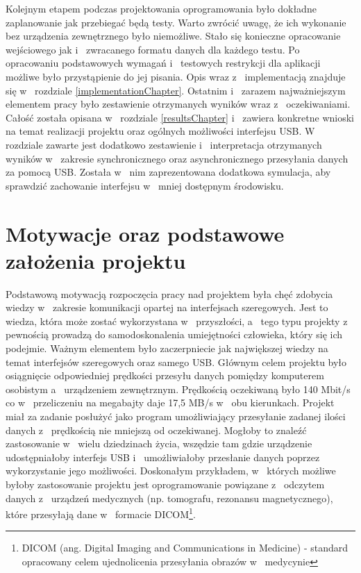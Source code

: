 \documentclass{BscUS}
\begin{document}
\newline
\indent Kolejnym etapem podczas projektowania oprogramowania było dokładne zaplanowanie jak przebiegać będą testy. Warto zwrócić uwagę, że ich wykonanie bez urządzenia zewnętrznego było niemożliwe. Stało się konieczne opracowanie wejściowego jak i~ zwracanego formatu danych dla każdego testu. Po opracowaniu podstawowych wymagań i~ testowych restrykcji dla aplikacji możliwe było przystąpienie do jej pisania. Opis wraz z~ implementacją znajduje się w~ rozdziale \ref{implementationChapter}.
\newline
\indent Ostatnim i~ zarazem najważniejszym elementem pracy było zestawienie otrzymanych wyników wraz z~ oczekiwaniami. Całość została opisana w~ rozdziale \ref{resultsChapter} i~ zawiera konkretne wnioski na temat realizacji projektu oraz ogólnych możliwości interfejsu USB. W~ rozdziale zawarte jest dodatkowo zestawienie i~ interpretacja otrzymanych wyników w~ zakresie synchronicznego oraz asynchronicznego przesyłania danych za pomocą USB. Została w~ nim zaprezentowana dodatkowa symulacja, aby sprawdzić zachowanie interfejsu w~ mniej dostępnym środowisku.

\chapter{Motywacje oraz podstawowe założenia projektu}
\label{ch:motivationAndBasics}
\indent Podstawową motywacją rozpoczęcia pracy nad projektem była chęć zdobycia wiedzy w~ zakresie komunikacji opartej na interfejsach szeregowych. Jest to wiedza, która może zostać wykorzystana w~ przyszłości, a~ tego typu projekty z~ pewnością prowadzą do samodoskonalenia umiejętności człowieka, który się ich podejmie. Ważnym elementem było zaczerpniecie jak największej wiedzy na temat interfejsów szeregowych oraz samego USB.
\newline
\indent Głównym celem projektu było osiągnięcie odpowiedniej prędkości przesyłu danych pomiędzy komputerem osobistym a~ urządzeniem zewnętrznym. Prędkością oczekiwaną było 140 Mbit/s co w~ przeliczeniu na megabajty daje 17,5 MB/s w~ obu kierunkach. Projekt miał za zadanie posłużyć jako program umożliwiający przesyłanie zadanej ilości danych z~ prędkością nie mniejszą od oczekiwanej. Mogłoby to znaleźć zastosowanie w~ wielu dziedzinach życia, wszędzie tam gdzie urządzenie udostępniałoby interfejs USB i~ umożliwiałoby przesłanie danych poprzez wykorzystanie jego możliwości. Doskonałym przykładem, w~ których możliwe byłoby zastosowanie projektu jest oprogramowanie powiązane z~ odczytem danych z~ urządzeń medycznych (np. tomografu, rezonansu magnetycznego), które przesyłają dane w~ formacie DICOM\footnote{DICOM (ang. Digital Imaging and Communications in Medicine) - standard opracowany celem ujednolicenia przesyłania obrazów w~ medycynie}.
\end{document}
